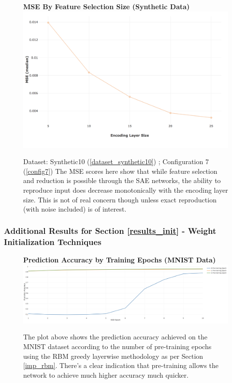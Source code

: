 \documentclass[a4paper,11pt,oneside]{article}
\theoremstyle{plain}
\theoremstyle{definition}
\begin{document}
	\begin{figure}[H]
		\centering 
		\textbf{MSE By Feature Selection Size (Synthetic Data)}
		\includegraphics[scale=0.3]{images/results/feature_selection/synth_sae_mse.png} 
		\caption[MSE By Feature Selection Size (Synthetic Data)]{Dataset: Synthetic10 (\ref{dataset_synthetic10}) ; Configuration 7 (\ref{config7})
			\newline The MSE scores here show that while feature selection and reduction is possible through the SAE networks, the ability to reproduce input does decrease monotonically with the encoding layer size. This is not of real concern though unless exact reproduction (with noise included) is of interest.}
		\label{figure-synth_sae_mse}
	\end{figure}
	
	\subsubsection{Additional Results for Section \ref{results_init} - Weight Initialization Techniques }\label{results_init_appendix}
	
	\begin{figure}[H]
		\centering 
		\textbf{Prediction Accuracy by Training Epochs (MNIST Data)} 
		\includegraphics[scale=0.2]{images/results/newinit/rbm_pretraining.png}
		\caption[Prediction Accuracy by Training Epochs (MNIST Data)]{The plot above shows the prediction accuracy achieved on the MNIST dataset according to the number of pre-training epochs using the RBM greedy layerwise methodology as per Section \ref{imp_rbm}. There's a clear indication that pre-training allows the network to achieve much higher accuracy much quicker.}
		\label{figure-rbm_pretraining}
	\end{figure}
	
\end{document}
